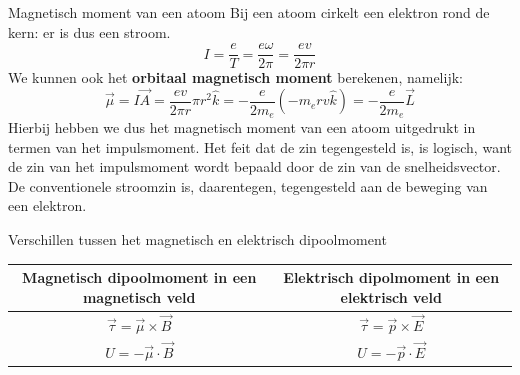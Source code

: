 \begin{app}{Magnetisch moment van een atoom}
    Bij een atoom cirkelt een elektron rond de kern: er is dus een stroom.
    \begin{equation*}
        I = \dfrac{e}{T} = \dfrac{e\omega}{2\pi} = \dfrac{ev}{2\pi r}
    \end{equation*}
    We kunnen ook het \textbf{orbitaal magnetisch moment} berekenen, namelijk: 
    \begin{equation*}
        \Vec{\mu} = I\Vec{A} = \dfrac{ev}{2\pi r} \pi r^{2} \hat{k} = -\dfrac{e}{2m_{e}}(-m_{e}rv\hat{k}) = -\dfrac{e}{2m_{e}}\Vec{L}
    \end{equation*}
    Hierbij hebben we dus het magnetisch moment van een atoom uitgedrukt in termen van het impulsmoment.
    Het feit dat de zin tegengesteld is, is logisch, want de zin van het impulsmoment wordt bepaald door de zin van de snelheidsvector.
    De conventionele stroomzin is, daarentegen, tegengesteld aan de beweging van een elektron.
\end{app}

\newpage

\begin{vrg}{Verschillen tussen het magnetisch en elektrisch dipoolmoment}
    \vspace{-0.3cm}
    \def\arraystretch{2}
    \centering
    \begin{tabular}{c|c}
       Magnetisch dipoolmoment in een magnetisch veld & Elektrisch dipolmoment in een elektrisch veld \\ \hline
        $\Vec{\tau} = \Vec{\mu} \times \Vec{B}$ & $\Vec{\tau} = \Vec{p} \times \Vec{E}$ \\ 
        $U = -\Vec{\mu} \cdot \Vec{B}$ & $U = -\Vec{p} \cdot \Vec{E}$ \\
    \end{tabular}
\end{vrg}

